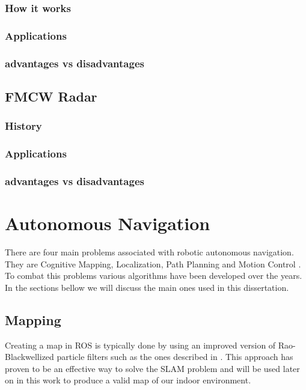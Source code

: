 \subsubsection{How it works}

\subsubsection{Applications}
\subsubsection{advantages vs disadvantages}

\subsection{FMCW Radar}
\subsubsection{History}
\subsubsection{Applications}
\subsubsection{advantages vs disadvantages}



\section {Autonomous Navigation}
There are four main problems associated with robotic autonomous navigation. They are Cognitive Mapping, Localization, Path Planning and Motion Control \cite{baranov2014}. To combat this problems various algorithms have been developed over the years. In the sections bellow we will discuss the main ones used in this dissertation.

\subsection{Mapping}

Creating a map in ROS is typically done by using an improved version of  Rao-Blackwellized particle filters such as the ones described in \cite{grisetti2007improved}. This approach has proven to be an effective way to solve the \ac{SLAM} problem and will be used later on in this work to produce a valid map of our indoor environment.
